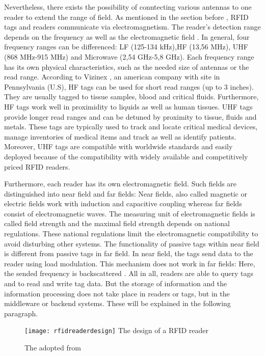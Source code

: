 Nevertheless, there exists the possibility of conntecting various antennas to one reader to extend the range of field.
As mentioned in the section before \pageref{tags}, RFID tags and readers communicate via electromagnetism. The reader's detection range depends on the frequency as well as the electromagnetic field \cite{henrici}. In general, four frequency ranges can be differenced: \ac{LF} (125-134 kHz),\ac{HF} (13,56 MHz), UHF (868 MHz-915 MHz) and Microwave (2,54 GHz-5,8 GHz). Each frequency range has its own physical characteristics, such as the needed size of antennas or the read range.
According to Vizinex \cite{vizinex}, an american company with site in Pennsylvania (U.S), HF tags can be used for short read ranges (up to 3 inches). They are usually tagged to tissue samples, blood and critical fluids. Furthermore, HF tags work well in proximidity to liquids as well as human tissues. UHF tags provide longer read ranges and can be detuned by proximity to tissue, fluids and metals. These tags are typically used to track and locate critical medical devices, manage inventories of medical items and track as well as identify patients. Moreover, UHF tags are compatible with worldwide standards and easily deployed because of the compatibility with widely available and competitively priced RFID readers.

Furthermore, each reader has its own electromagnetic field. Such fields are distinguished into near field and far fields: Near fields, also called magnetic or electric fields work with induction and capacitive coupling whereas far fields consist of electromagnetic waves. The measuring unit of electromagnetic fields is called field strength and the maximal field strength depends on national regulations. These national regulations limit the electromagnetic compatibility to avoid disturbing other systems. The functionality of passive tags within near field is different from passive tags in far field. In near field, the tags send data to the reader using load modulation. This mechanism does not work in far fields: Here, the sended frequency is backscattered \cite{henrici}.
All in all, readers are able to query tags and to read and write tag data. But the storage of information and the information processing does not take place in readers or tags, but in the middleware or backend systems. These will be explained in the following paragraph.

\begin{figure}
\centering
\texttt{[image: rfidreaderdesign]} The design of a RFID reader 
\caption{\label{fig:readerdesign}The adopted from \cite[p.17]{chipless}} 
\end{figure}

